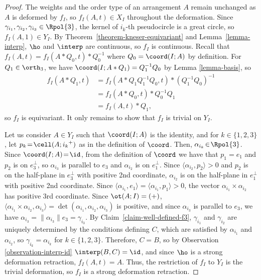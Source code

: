 \begin{proof}
The weights and the order type of an arrangement $A$ remain unchanged as $A$ is deformed by $f_I$, so $f_I(A,t) \in X_I$ throughout the deformation.
Since $\gamma_{i_1},\gamma_{i_2},\gamma_{i_3} \in \Rpol{3}$, the kernel of $i_k$-th pseudocircle is a great circle, so $f_I(A,1) \in Y_I$. By Theorem~\ref{theorem-kneser-equivariant} and Lemma~\ref{lemma-interp}, $\ho$ and $\interp$ are continuous, so $f_I$ is continuous.
Recall that $f_I(A,t) = f_I(A*Q_0,t)*Q_0^{-1}$ where $Q_0 = \coord(I;A)$ by definition.
For $Q_1 \in \orth_3$,
we have ${\coord(I;A*Q_1) = Q_1^{-1}Q_0}$ by Lemma \ref{lemma-basis}, so
\begin{align*}
f_I(A*Q_1,t) & = f_I(A*Q_1Q_1^{-1}Q_0,t)*(Q_1^{-1}Q_0)^{-1} \\
& = f_I(A*Q_0,t)*Q_0^{-1}Q_1 \\
& = f_I(A,t)*Q_1,
\end{align*}
so $f_I$ is equivariant.
It only remains to show that $f_I$ is trivial on $Y_I$.

Let us consider $A\!\in\!Y_I$ such that $\coord(I;A)$ is the identity,
and for $k\!\in\!\{1,2,3\}$, let $p_k\!=\!\cell(A;{i_k}^+)$ as in the definition of $\coord$.
Then, $\alpha_{i_k}\!\in\!\Rpol{3}$. Since \hbox{$\coord(I;A)\!=\!\id$}, from the definition of $\coord$ we have that $p_1 = e_1$ and $p_2$ is on $e_3^\bot$, so $\alpha_{i_3}$ is parallel to $e_3$ and $\alpha_{i_2}$ is on $e_1^\bot$.
Since $\langle \alpha_{i_2},p_2 \rangle > 0$ and $p_2$ is on the half-plane in $e_3^\bot$ with positive 2nd coordinate, $\alpha_{i_2}$ is on the half-plane in $e_1^\bot$ with positive 2nd coordinate.
Since $\langle \alpha_{i_1},e_1 \rangle = \langle \alpha_{i_1},p_1 \rangle > 0$,
the vector $\alpha_{i_1} \times \alpha_{i_2}$ has positive 3rd coordinate.
Since $\ot(A;I) = (+)$,
$\langle \alpha_{i_1} \times \alpha_{i_2}, \alpha_{i_3} \rangle = \det(\alpha_{i_1},\alpha_{i_2},\alpha_{i_3})$ is positive, and since $\alpha_{i_3}$ is parallel to $e_3$, we have $\alpha_{i_3} = \|\alpha_{i_3}\|e_3 = \gamma_{i_3}$.
By Claim~\ref{claim-well-defined-f3}, $\gamma_{i_1}$ and $\gamma_{i_2}$ are uniquely determined by the conditions defining $C$, which are satisfied by $\alpha_{i_1}$ and $\alpha_{i_2}$, so \hbox{$\gamma_{i_k} = \alpha_{i_k}$} for $k\in\{1,2,3\}$. Therefore, $C=B$, so by Observation \ref{observation-interp-id} $\interp(B,C) = \id$, and since $\ho$ is a strong deformation retraction, $f_I(A,t) = A$. Thus, the restriction of $f_I$ to $Y_I$ is the trivial deformation, so $f_I$ is a strong deformation retraction.
\end{proof}

